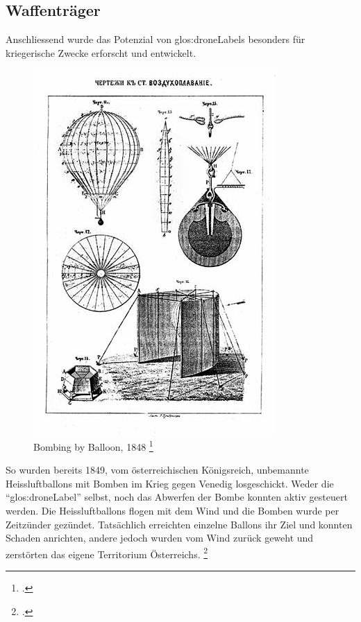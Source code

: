 \subsection{Waffenträger}
Anschliessend wurde das Potenzial von \glspl{glos:droneLabel} besonders für kriegerische Zwecke erforscht und entwickelt.

\begin{figure}
	\includegraphics[width=1.0\linewidth]{images/analysis/balloonbombs1849.jpg}
 	\caption[Bombing by Balloon, 1848]{Bombing by Balloon, 1848 \protect\footcite{Remote_Piloted_Aerial_Vehicles_2015-03-21}}
\end{figure}

So wurden bereits 1849, vom österreichischen Königsreich, unbemannte Heissluftballons mit Bomben im Krieg gegen Venedig losgeschickt.
Weder die "`\gls{glos:droneLabel}"' selbst, noch das Abwerfen der Bombe konnten aktiv gesteuert werden.
Die Heissluftballons flogen mit dem Wind und die Bomben wurde per Zeitzünder gezündet. Tatsächlich erreichten einzelne Ballons ihr Ziel und konnten Schaden anrichten, andere jedoch wurden vom Wind zurück geweht und zerstörten das eigene Territorium Österreichs. \footcite{Remote_Piloted_Aerial_Vehicles_2015-03-21}

